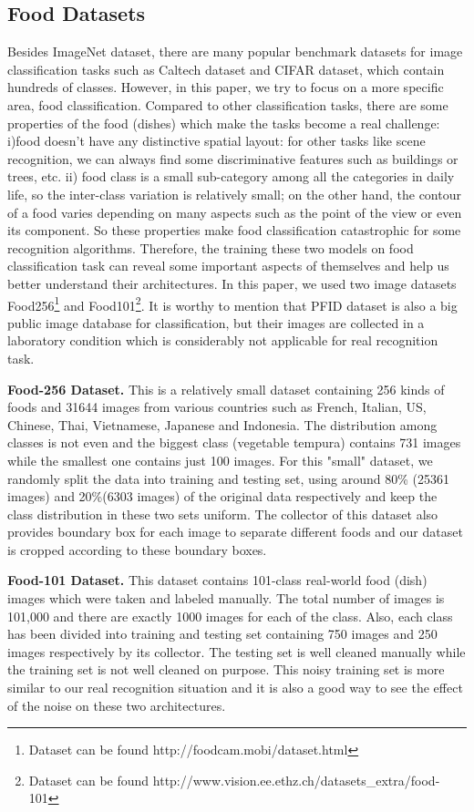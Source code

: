 \subsection{Food Datasets}
Besides ImageNet dataset, there are many popular benchmark datasets for image classification tasks such as Caltech dataset and CIFAR dataset, which contain hundreds of classes. However, in this paper, we try to focus on a more specific area, food classification. Compared to other classification tasks, there are some properties of the food (dishes) which make the tasks become a real challenge:  
i)food doesn't have any distinctive spatial layout: for other tasks like scene recognition, we can always find some discriminative features such as buildings or trees, etc. 
ii) food class is a small sub-category among all the categories in daily life, so the inter-class variation is relatively small; on the other hand, the contour of a food varies depending on many aspects such as the point of the view or even its component. 
So these properties make food classification catastrophic for some recognition algorithms. Therefore, the training these two models on food classification task can reveal some important aspects of themselves and help us better understand their architectures. In this paper, we used two image datasets Food256\cite{kawano14c}\footnote{Dataset can be found http://foodcam.mobi/dataset.html} and Food101\cite{bossard14}\footnote{Dataset can be found http://www.vision.ee.ethz.ch/datasets\_extra/food-101}. It is worthy to mention that PFID dataset is also a big public image database for classification, but their images are collected in a laboratory condition which is considerably not applicable for real recognition task.

\textbf{Food-256 Dataset.}
This is a relatively small dataset containing 256 kinds of foods and 31644 images from various countries such as French, Italian, US, Chinese, Thai, Vietnamese, Japanese and Indonesia. The distribution among classes is not even and the biggest class (vegetable tempura) contains 731 images while the smallest one contains just 100 images. For this "small" dataset, we randomly split the data into training and testing set, using around 80\% (25361 images) and 20\%(6303 images) of the original data respectively and keep the class distribution in these two sets uniform. The collector of this dataset also provides boundary box for each image to separate different foods and our dataset is cropped according to these boundary boxes.

\textbf{Food-101 Dataset.}
This dataset contains 101-class real-world food (dish) images which were taken and labeled manually. The total number of images is 101,000 and there are exactly 1000 images for each of the class. Also, each class has been divided into training and testing set containing 750 images and 250 images respectively by its collector. The testing set is well cleaned manually while the training set is not well cleaned on purpose. This noisy training set is more similar to our real recognition situation and it is also a good way to see the effect of the noise on these two architectures.

